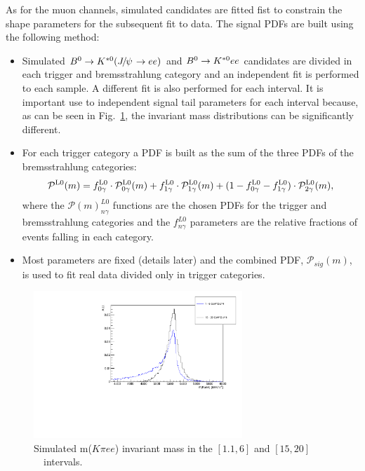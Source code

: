 As for the muon channels, simulated candidates are fitted fist to constrain
the shape parameters for the subsequent fit to data. The signal PDFs are built using the following method:
%
\begin{itemize}
\item Simulated $\Bz\to\Kstarz(\jpsi\to ee)$ and ${{B}^0}\rightarrow{\ensuremath{{K}^{*0}}} ee$ candidates are divided
in each trigger and bremsstrahlung category and an independent fit is performed to each sample.
A different fit is also performed for each \qsq interval. It is important use to independent signal tail parameters 
for each \qsq interval because, as can be seen in Fig.~\ref{fig:high_central_mass_comparison}, the invariant mass
distributions can be significantly different.
\item For each trigger category a PDF is built as the sum of the three PDFs of the bremsstrahlung categories:
\begin{equation}
\mathcal{P}^{\rm L0}(m) = f^{\rm L0}_{0\gamma} \cdot \mathcal{P}^{\rm L0}_{0\gamma}(m) + f^{\rm L0}_{1\gamma} \cdot \mathcal{P}^{\rm L0}_{1\gamma}(m) + (1 - f^{\rm L0}_{0\gamma} - f^{\rm L0}_{1\gamma}) \cdot  \mathcal{P}^{\rm L0}_{2\gamma}(m),
\end{equation}
where the $\mathcal{P}(m)^{L0}_{n\gamma}$ functions are the chosen PDFs for the trigger and bremsstrahlung categories
and the $f^{L0}_{n\gamma}$ parameters are the relative fractions of events falling in each category.
\item Most parameters are fixed (details later) and the combined PDF, $\mathcal{P}_{sig}(m)$,
is used to fit real data divided only in trigger categories.
\end{itemize}
%
\begin{figure}[h!]
\centering
\includegraphics[width=0.70\textwidth]{RKst/figs/high_central_mass_comparison.pdf}
\caption{Simulated m($K\pi ee$) invariant mass in the $[1.1,6]$ and $[15,20]$~\gevgevcccc~\qsq intervals.  }
\label{fig:high_central_mass_comparison}
\end{figure}

